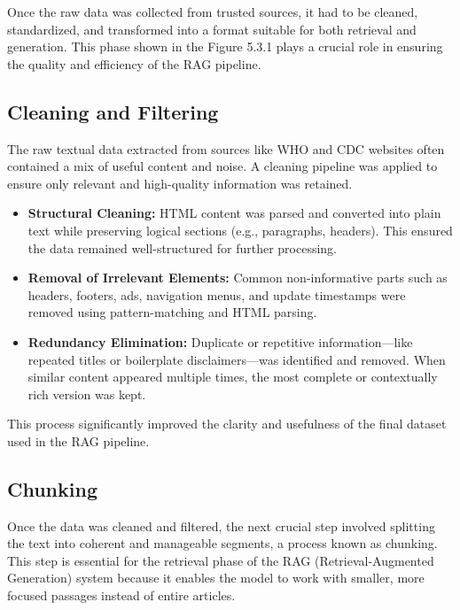 \label{sec:data-preparation}

Once the raw data was collected from trusted sources, it had to be cleaned, standardized, and transformed into a format suitable for both retrieval and generation. This phase shown in the Figure 5.3.1 plays a crucial role in ensuring the quality and efficiency of the RAG pipeline.

\subsection{Cleaning and Filtering}
\label{subsec:cleaning-filtering}

The raw textual data extracted from sources like WHO and CDC websites often contained a mix of useful content and noise. A cleaning pipeline was applied to ensure only relevant and high-quality information was retained.

\begin{itemize}
    \item \textbf{Structural Cleaning:} HTML content was parsed and converted into plain text while preserving logical sections (e.g., paragraphs, headers). This ensured the data remained well-structured for further processing.
    
    \item \textbf{Removal of Irrelevant Elements:} Common non-informative parts such as headers, footers, ads, navigation menus, and update timestamps were removed using pattern-matching and HTML parsing.
    
    \item \textbf{Redundancy Elimination:} Duplicate or repetitive information—like repeated titles or boilerplate disclaimers—was identified and removed. When similar content appeared multiple times, the most complete or contextually rich version was kept.
\end{itemize}

This process significantly improved the clarity and usefulness of the final dataset used in the RAG pipeline.

\subsection{Chunking}
\label{subsec:chunking}

Once the data was cleaned and filtered, the next crucial step involved splitting the text into coherent and manageable segments, a process known as chunking. This step is essential for the retrieval phase of the RAG (Retrieval-Augmented Generation) system because it enables the model to work with smaller, more focused passages instead of entire articles.

